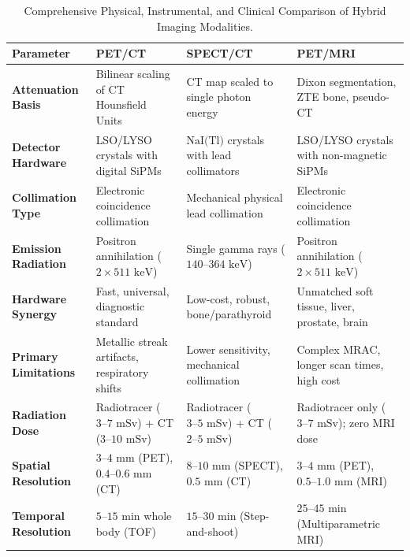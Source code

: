 \documentclass[11pt,a4paper]{article}
\begin{document}
\begin{table}[htbp]
\centering
\small
\setlength{\tabcolsep}{2.5pt}
\caption{Comprehensive Physical, Instrumental, and Clinical Comparison of Hybrid Imaging Modalities.}
\label{tab:hybrid_comparison}
\begin{tabular}{p{2.6cm} p{3.8cm} p{3.8cm} p{4.5cm}}
\toprule
\textbf{Parameter} & \textbf{PET/CT} & \textbf{SPECT/CT} & \textbf{PET/MRI} \\
\midrule
\textbf{Attenuation Basis} & Bilinear scaling of CT Hounsfield Units & CT map scaled to single photon energy & Dixon segmentation, ZTE bone, pseudo-CT \\
\addlinespace
\textbf{Detector Hardware} & LSO/LYSO crystals with digital SiPMs & $\text{NaI(Tl)}$ crystals with lead collimators & LSO/LYSO crystals with non-magnetic SiPMs \\
\addlinespace
\textbf{Collimation Type} & Electronic coincidence collimation & Mechanical physical lead collimation & Electronic coincidence collimation \\
\addlinespace
\textbf{Emission Radiation} & Positron annihilation ($2\times 511\text{ keV}$) & Single gamma rays ($140\text{--}364\text{ keV}$) & Positron annihilation ($2\times 511\text{ keV}$) \\
\addlinespace
\textbf{Hardware Synergy} & Fast, universal, diagnostic standard & Low-cost, robust, bone/parathyroid & Unmatched soft tissue, liver, prostate, brain \\
\addlinespace
\textbf{Primary Limitations} & Metallic streak artifacts, respiratory shifts & Lower sensitivity, mechanical collimation & Complex MRAC, longer scan times, high cost \\
\addlinespace
\textbf{Radiation Dose} & Radiotracer ($3\text{--}7\text{ mSv}$) + CT ($3\text{--}10\text{ mSv}$) & Radiotracer ($3\text{--}5\text{ mSv}$) + CT ($2\text{--}5\text{ mSv}$) & Radiotracer only ($3\text{--}7\text{ mSv}$); zero MRI dose \\
\addlinespace
\textbf{Spatial Resolution} & $3\text{--}4\text{ mm}$ (PET), $0.4\text{--}0.6\text{ mm}$ (CT) & $8\text{--}10\text{ mm}$ (SPECT), $0.5\text{ mm}$ (CT) & $3\text{--}4\text{ mm}$ (PET), $0.5\text{--}1.0\text{ mm}$ (MRI) \\
\addlinespace
\textbf{Temporal Resolution} & $5\text{--}15\text{ min}$ whole body (TOF) & $15\text{--}30\text{ min}$ (Step-and-shoot) & $25\text{--}45\text{ min}$ (Multiparametric MRI) \\
\bottomrule
\end{tabular}
\end{table}
\end{document}
